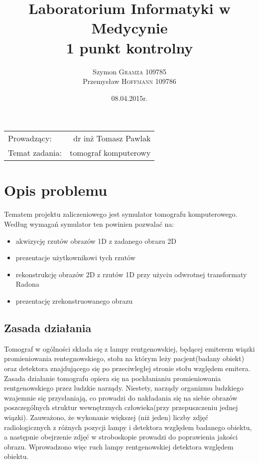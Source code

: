 \documentclass[A_4paper,12pt]{article}
\title{Laboratorium Informatyki w Medycynie \\ 1 punkt kontrolny} %
\author{Szymon \textsc{Gramza} 109785  \\ Przemysław \textsc{Hoffmann} 109786} %
\date{08.04.2015r.} %
\begin{document}
\maketitle %

\begin{center}
\begin{tabular}{l r}
Prowadzący: & dr inż Tomasz Pawlak \\
Temat zadania: & tomograf komputerowy
\end{tabular}
\end{center}

\newpage

\section{Opis problemu}
Tematem projektu zaliczeniowego jest symulator tomografu komputerowego.
Według wymagań symulator ten powinien pozwalać na:
\begin{itemize}
\item akwizycję rzutów obrazów 1D z zadanego obrazu 2D
\item prezentacje użytkownikowi tych rzutów
\item rekonstrukcję obrazów 2D z rzutów 1D przy użyciu odwrotnej transformaty Radona
\item prezentację zrekonstruowanego obrazu
\end{itemize}

\subsection{Zasada działania}
Tomograf w ogólności składa się z lampy rentgenowskiej, będącej emiterem wiązki promieniowania rentegnowskiego, stołu na którym leży pacjent(badany obiekt) oraz  detektora znajdującego się po przeciwległej stronie stołu względem emitera.
Zasada działanie tomografu opiera się na pochłanianiu promieniowania rentgenowskiego przez ludzkie narządy.
Niestety, narządy organizmu ludzkiego wzajemnie się przysłaniają, co prowadzi do nakładania się na siebie obrazów poszczególnych struktur wewnętrznych człowieka(przy przepuszczeniu jednej wiązki).
Zauważono, że wykonanie większej (niż jeden) liczby zdjęć radiologicznych z różnych pozycji lampy i detektora względem badanego obiektu, a następnie obejrzenie zdjęć w stroboskopie prowadzi do poprawienia jakości obrazu. Wprowadzono więc ruch lampy rentgenowskiej detektora względem obiektu.
\end{document}
